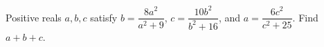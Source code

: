 Positive reals $a,b,c$ satisfy $b=\dfrac{8a^2}{a^2+9}$, $c=\dfrac{10b^2}{b^2+16}$, and $a=\dfrac{6c^2}{c^2+25}$. Find $a+b+c$.
